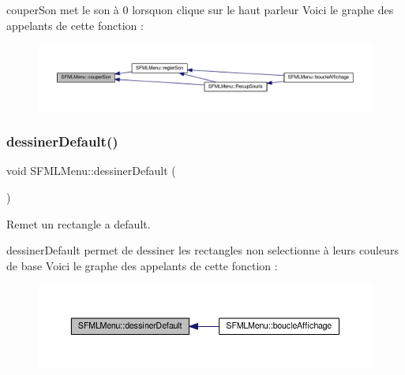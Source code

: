 couper\+Son met le son à 0 lorsqu\textquotesingle{}on clique sur le haut parleur Voici le graphe des appelants de cette fonction \+:\nopagebreak
\begin{figure}[H]
\begin{center}
\leavevmode
\includegraphics[width=350pt]{class_s_f_m_l_menu_a05f9dda2fac7c0c0a354c5caa5faccb5_icgraph}
\end{center}
\end{figure}
\mbox{\label{class_s_f_m_l_menu_acd577e51e9a54e6028976e5c739e5e92}} 
\subsubsection{\texorpdfstring{dessiner\+Default()}{dessinerDefault()}}
{\footnotesize\ttfamily void S\+F\+M\+L\+Menu\+::dessiner\+Default (\begin{DoxyParamCaption}{ }\end{DoxyParamCaption})\hspace{0.3cm}{\ttfamily [private]}}



Remet un rectangle a default. 

dessiner\+Default permet de dessiner les rectangles non selectionne à leurs couleurs de base Voici le graphe des appelants de cette fonction \+:\nopagebreak
\begin{figure}[H]
\begin{center}
\leavevmode
\includegraphics[width=350pt]{class_s_f_m_l_menu_acd577e51e9a54e6028976e5c739e5e92_icgraph}
\end{center}
\end{figure}
\mbox{\label{class_s_f_m_l_menu_a9277783624a1058bfa5cb7e9dbc16d5c}} 
